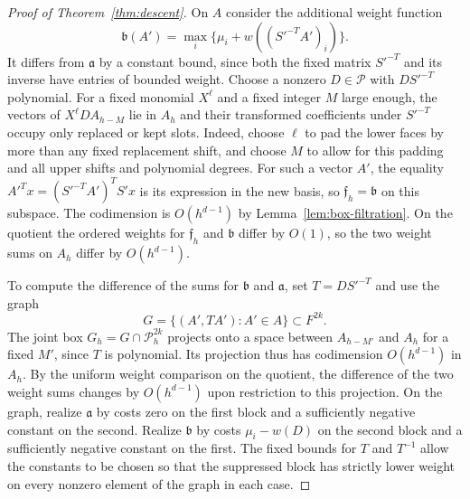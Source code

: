 \documentclass[11pt,a4paper,reqno]{amsart}
\theoremstyle{definition}
\theoremstyle{remark}
\numberwithin{equation}{section}
\begin{document}
\begin{proof}[Proof of Theorem~\ref{thm:descent}]
On \(A\) consider the additional weight function
\[
 \mathfrak b(A')=\max_i\{\mu_i+w((S'^{-T}A')_i)\}.
\]
It differs from \(\mathfrak a\) by a constant bound, since both the
fixed matrix \(S'^{-T}\) and its inverse have entries of bounded
weight. Choose a nonzero \(D\in\mathcal P\) with \(DS'^{-T}\)
polynomial. For a fixed monomial \(X^\ell\) and a fixed integer \(M\)
large enough, the vectors of \(X^\ell D A_{h-M}\) lie in \(A_h\)
and their transformed coefficients under \(S'^{-T}\) occupy only
replaced or kept slots. Indeed, choose \(\ell\) to pad the lower
faces by more than any fixed replacement shift, and choose \(M\)
to allow for this padding and all upper shifts and polynomial degrees.
For such a vector \(A'\), the equality
\(A'^T x=(S'^{-T}A')^T S'x\) is its expression in the new basis,
so \(\mathfrak f_h=\mathfrak b\) on this subspace.
The codimension is \(O(h^{d-1})\) by Lemma~\ref{lem:box-filtration}.
On the quotient the ordered weights for \(\mathfrak f_h\) and
\(\mathfrak b\) differ by \(O(1)\), so the two weight sums on
\(A_h\) differ by \(O(h^{d-1})\).

To compute the difference of the sums for \(\mathfrak b\) and
\(\mathfrak a\), set \(T=DS'^{-T}\) and use the graph
\[
 G=\{(A',TA'):A'\in A\}\subset F^{2k}.
\]
The joint box \(G_h=G\cap\mathcal P_h^{2k}\) projects onto a space
between \(A_{h-M'}\) and \(A_h\) for a fixed \(M'\), since \(T\)
is polynomial. Its projection thus has codimension \(O(h^{d-1})\)
in \(A_h\). By the uniform weight comparison on the quotient,
the difference of the two weight sums changes by \(O(h^{d-1})\)
upon restriction to this projection.
On the graph, realize \(\mathfrak a\) by costs zero on the first
block and a sufficiently negative constant on the second.
Realize \(\mathfrak b\) by costs \(\mu_i-w(D)\) on the second
block and a sufficiently negative constant on the first.
The fixed bounds for \(T\) and \(T^{-1}\) allow the constants
to be chosen so that the suppressed block has strictly lower
weight on every nonzero element of the graph in each case.


\end{proof}
\end{document}
